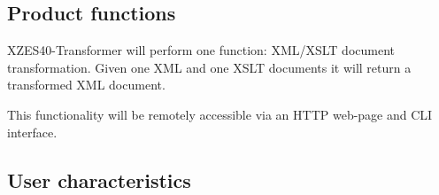 \subsection{Product functions}
% 

XZES40-Transformer will perform one function: XML/XSLT document transformation.
Given one XML and one XSLT documents it will return a transformed XML document.

This functionality will be remotely accessible via an HTTP web-page and CLI interface.


\subsection{User characteristics}


